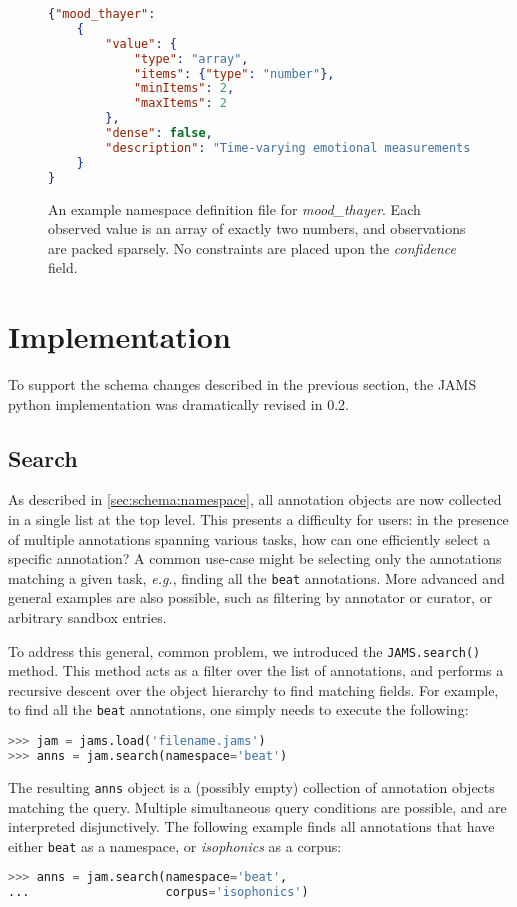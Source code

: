 \documentclass{article}
\begin{document}
\begin{figure}
    \begin{lstlisting}[language=json,title={mood\_thayer.json}]
{"mood_thayer":
    {
        "value": {
            "type": "array",
            "items": {"type": "number"},
            "minItems": 2,
            "maxItems": 2
        },
        "dense": false,
        "description": "Time-varying emotional measurements as ordered pairs of (valence, arousal)"
    }
}
\end{lstlisting}
\caption{An example namespace definition file for \emph{mood\_thayer}.  Each observed
value is an array of exactly two numbers, and observations are packed sparsely.  No
constraints are placed upon the \emph{confidence} field.\label{fig:thayer}}
\end{figure}


\section{Implementation}\label{sec:implementation}

To support the schema changes described in the previous section, the JAMS python 
implementation was dramatically revised in 0.2.

\subsection{Search}\label{sec:imp:search}
As described in \ref{sec:schema:namespace}, all annotation objects are now collected in a
single list at the top level.  This presents a difficulty for users: in the presence of
multiple annotations spanning various tasks, how can one efficiently select a specific
annotation?  A common use-case might be selecting only the annotations matching a given
task, \emph{e.g.}, finding all the \texttt{beat} annotations.  More advanced and general
examples are also possible, such as filtering by annotator or curator, or arbitrary
sandbox entries.

To address this general, common problem, we introduced the \texttt{JAMS.search()} method.
This method acts as a filter over the list of annotations, and performs a recursive
descent over the object hierarchy to find matching fields.  For example, to find all the
\texttt{beat} annotations, one simply needs to execute the following:
\begin{lstlisting}[language=python]
>>> jam = jams.load('filename.jams')
>>> anns = jam.search(namespace='beat')
\end{lstlisting}
The resulting \texttt{anns} object is a (possibly empty) collection of annotation objects
matching the query.  Multiple simultaneous query conditions are possible, and are 
interpreted disjunctively.
The following example finds all annotations that have either
\texttt{beat} as a namespace, or \emph{isophonics} as a corpus:
\begin{lstlisting}[language=python]
>>> anns = jam.search(namespace='beat',
...                   corpus='isophonics')
\end{lstlisting}
\end{document}
